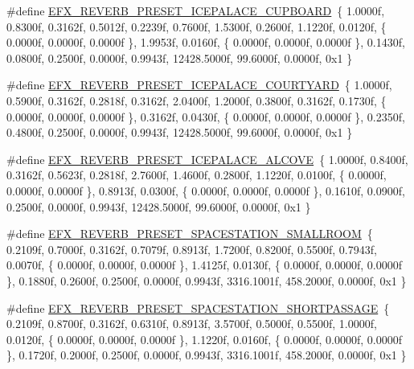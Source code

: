 \begin{DoxyCompactItemize}
\item 
\#define \mbox{\hyperlink{efx-presets_8h_a8d2347d94396aaab88765c1129f51e19}{E\+F\+X\+\_\+\+R\+E\+V\+E\+R\+B\+\_\+\+P\+R\+E\+S\+E\+T\+\_\+\+I\+C\+E\+P\+A\+L\+A\+C\+E\+\_\+\+C\+U\+P\+B\+O\+A\+RD}}~\{ 1.\+0000f, 0.\+8300f, 0.\+3162f, 0.\+5012f, 0.\+2239f, 0.\+7600f, 1.\+5300f, 0.\+2600f, 1.\+1220f, 0.\+0120f, \{ 0.\+0000f, 0.\+0000f, 0.\+0000f \}, 1.\+9953f, 0.\+0160f, \{ 0.\+0000f, 0.\+0000f, 0.\+0000f \}, 0.\+1430f, 0.\+0800f, 0.\+2500f, 0.\+0000f, 0.\+9943f, 12428.\+5000f, 99.\+6000f, 0.\+0000f, 0x1 \}
\item 
\#define \mbox{\hyperlink{efx-presets_8h_a4f06e2e425b3cefc3300fdef1100a739}{E\+F\+X\+\_\+\+R\+E\+V\+E\+R\+B\+\_\+\+P\+R\+E\+S\+E\+T\+\_\+\+I\+C\+E\+P\+A\+L\+A\+C\+E\+\_\+\+C\+O\+U\+R\+T\+Y\+A\+RD}}~\{ 1.\+0000f, 0.\+5900f, 0.\+3162f, 0.\+2818f, 0.\+3162f, 2.\+0400f, 1.\+2000f, 0.\+3800f, 0.\+3162f, 0.\+1730f, \{ 0.\+0000f, 0.\+0000f, 0.\+0000f \}, 0.\+3162f, 0.\+0430f, \{ 0.\+0000f, 0.\+0000f, 0.\+0000f \}, 0.\+2350f, 0.\+4800f, 0.\+2500f, 0.\+0000f, 0.\+9943f, 12428.\+5000f, 99.\+6000f, 0.\+0000f, 0x1 \}
\item 
\#define \mbox{\hyperlink{efx-presets_8h_ab735161bb3f91b845c66c6daacd30ef2}{E\+F\+X\+\_\+\+R\+E\+V\+E\+R\+B\+\_\+\+P\+R\+E\+S\+E\+T\+\_\+\+I\+C\+E\+P\+A\+L\+A\+C\+E\+\_\+\+A\+L\+C\+O\+VE}}~\{ 1.\+0000f, 0.\+8400f, 0.\+3162f, 0.\+5623f, 0.\+2818f, 2.\+7600f, 1.\+4600f, 0.\+2800f, 1.\+1220f, 0.\+0100f, \{ 0.\+0000f, 0.\+0000f, 0.\+0000f \}, 0.\+8913f, 0.\+0300f, \{ 0.\+0000f, 0.\+0000f, 0.\+0000f \}, 0.\+1610f, 0.\+0900f, 0.\+2500f, 0.\+0000f, 0.\+9943f, 12428.\+5000f, 99.\+6000f, 0.\+0000f, 0x1 \}
\item 
\#define \mbox{\hyperlink{efx-presets_8h_a93b3631fec62a41f9698ce61cab40c46}{E\+F\+X\+\_\+\+R\+E\+V\+E\+R\+B\+\_\+\+P\+R\+E\+S\+E\+T\+\_\+\+S\+P\+A\+C\+E\+S\+T\+A\+T\+I\+O\+N\+\_\+\+S\+M\+A\+L\+L\+R\+O\+OM}}~\{ 0.\+2109f, 0.\+7000f, 0.\+3162f, 0.\+7079f, 0.\+8913f, 1.\+7200f, 0.\+8200f, 0.\+5500f, 0.\+7943f, 0.\+0070f, \{ 0.\+0000f, 0.\+0000f, 0.\+0000f \}, 1.\+4125f, 0.\+0130f, \{ 0.\+0000f, 0.\+0000f, 0.\+0000f \}, 0.\+1880f, 0.\+2600f, 0.\+2500f, 0.\+0000f, 0.\+9943f, 3316.\+1001f, 458.\+2000f, 0.\+0000f, 0x1 \}
\item 
\#define \mbox{\hyperlink{efx-presets_8h_a6d8fba878e713dcc1f9823e5e4a8ec8d}{E\+F\+X\+\_\+\+R\+E\+V\+E\+R\+B\+\_\+\+P\+R\+E\+S\+E\+T\+\_\+\+S\+P\+A\+C\+E\+S\+T\+A\+T\+I\+O\+N\+\_\+\+S\+H\+O\+R\+T\+P\+A\+S\+S\+A\+GE}}~\{ 0.\+2109f, 0.\+8700f, 0.\+3162f, 0.\+6310f, 0.\+8913f, 3.\+5700f, 0.\+5000f, 0.\+5500f, 1.\+0000f, 0.\+0120f, \{ 0.\+0000f, 0.\+0000f, 0.\+0000f \}, 1.\+1220f, 0.\+0160f, \{ 0.\+0000f, 0.\+0000f, 0.\+0000f \}, 0.\+1720f, 0.\+2000f, 0.\+2500f, 0.\+0000f, 0.\+9943f, 3316.\+1001f, 458.\+2000f, 0.\+0000f, 0x1 \}

\end{DoxyCompactItemize}
